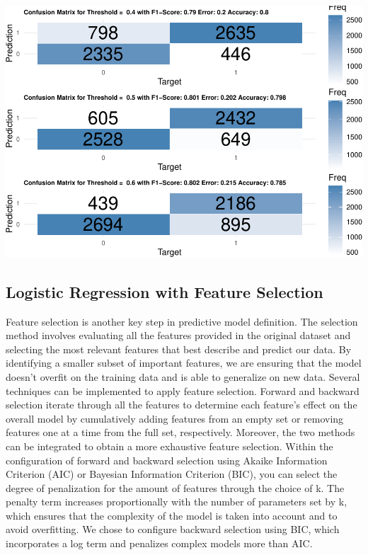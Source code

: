 \documentclass[
]{article}
\begin{document}
\includegraphics{Rain_Australia_files/figure-latex/log. regression pre feature selection-1.pdf}

\hypertarget{logistic-regression-with-feature-selection}{%
\subsection{Logistic Regression with Feature
Selection}\label{logistic-regression-with-feature-selection}}

Feature selection is another key step in predictive model definition.
The selection method involves evaluating all the features provided in
the original dataset and selecting the most relevant features that best
describe and predict our data. By identifying a smaller subset of
important features, we are ensuring that the model doesn't overfit on
the training data and is able to generalize on new data. Several
techniques can be implemented to apply feature selection. Forward and
backward selection iterate through all the features to determine each
feature's effect on the overall model by cumulatively adding features
from an empty set or removing features one at a time from the full set,
respectively. Moreover, the two methods can be integrated to obtain a
more exhaustive feature selection. Within the configuration of forward
and backward selection using Akaike Information Criterion (AIC) or
Bayesian Information Criterion (BIC), you can select the degree of
penalization for the amount of features through the choice of k. The
penalty term increases proportionally with the number of parameters set
by k, which ensures that the complexity of the model is taken into
account and to avoid overfitting. We chose to configure backward
selection using BIC, which incorporates a log term and penalizes complex
models more than AIC.
\end{document}
